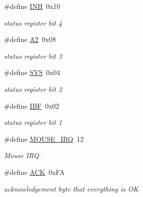 \begin{DoxyCompactItemize}
\#define \hyperlink{group__mouse__macros_ga03f542f1e0e2ba512c4ed189decfee3d}{I\+NH}~0x10
\begin{DoxyCompactList}\small\item\em status register bit 4 \end{DoxyCompactList}\item 
\mbox{\label{group__mouse__macros_ga2946bc30423c2a996eeafa49e995c30e}} 
\#define \hyperlink{group__mouse__macros_ga2946bc30423c2a996eeafa49e995c30e}{A2}~0x08
\begin{DoxyCompactList}\small\item\em status register bit 3 \end{DoxyCompactList}\item 
\mbox{\label{group__mouse__macros_gae3d9f52a1a315303ad04f0576bd42a25}} 
\#define \hyperlink{group__mouse__macros_gae3d9f52a1a315303ad04f0576bd42a25}{S\+YS}~0x04
\begin{DoxyCompactList}\small\item\em status register bit 2 \end{DoxyCompactList}\item 
\mbox{\label{group__mouse__macros_ga3c48b10907056351582baf9f6478598e}} 
\#define \hyperlink{group__mouse__macros_ga3c48b10907056351582baf9f6478598e}{I\+BF}~0x02
\begin{DoxyCompactList}\small\item\em status register bit 1 \end{DoxyCompactList}\item 
\mbox{\label{group__mouse__macros_ga85964cb90343bb1a029b1d1b4229f910}} 
\#define \hyperlink{group__mouse__macros_ga85964cb90343bb1a029b1d1b4229f910}{M\+O\+U\+S\+E\+\_\+\+I\+RQ}~12
\begin{DoxyCompactList}\small\item\em Mouse I\+RQ. \end{DoxyCompactList}\item 
\mbox{\label{group__mouse__macros_ga6f6489887e08bff4887d0bc5dcf214d8}} 
\#define \hyperlink{group__mouse__macros_ga6f6489887e08bff4887d0bc5dcf214d8}{A\+CK}~0x\+FA
\begin{DoxyCompactList}\small\item\em acknowledgement byte that everything is OK \end{DoxyCompactList}\item 

\end{DoxyCompactItemize}
